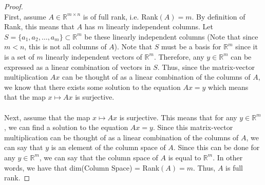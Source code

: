 \documentclass[10pt,a4paper]{article}
\theoremstyle{definition}
\theoremstyle{definition}
\numberwithin{equation}{section}
\begin{document}
\begin{proof}$ $
\\First, assume $A \in \mathbb{R}^{m \times n}$ is of full rank, i.e. Rank$(A) = m$. By definition of Rank, this means that $A$ has $m$ linearly independent columns. Let $S = \{a_1, a_2, \ldots, a_m\} \subset \mathbb{R}^m$ be these linearly independent columns (Note that since $m < n$, this is not all columns of $A$). Note that $S$ must be a basis for $\mathbb{R}^m$ since it is a set of $m$ linearly independent vectors of $\mathbb{R}^m$. Therefore, any $y \in \mathbb{R}^m$ can be expressed as a linear combination of vectors in $S$. Thus, since the matrix-vector multiplication $Ax$ can be thought of as a linear combination of the columns of $A$, we know that there exists some solution to the equation $Ax = y$ which means that the map $x \mapsto Ax$ is surjective. 
\\
\\Next, assume that the map $x \mapsto Ax$ is surjective. This means that for any $y \in \mathbb{R}^m$, we can find a solution to the equation $Ax = y$. Since this matrix-vector multiplication can be thought of as a linear combination of the columns of $A$, we can say that $y$ is an element of the column space of $A$. Since this can be done for any $y \in \mathbb{R}^m$, we can say that the column space of $A$ is equal to $\mathbb{R}^m$. In other words, we have that dim(Column Space) = Rank$(A) = m$. Thus, $A$ is full rank. 
\end{proof}
\end{document}
